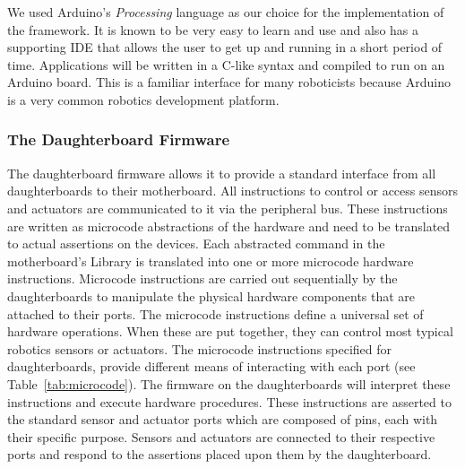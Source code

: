 	We used Arduino's \emph{Processing} language as our choice for the implementation of the framework. It is known to be very easy to learn and use and also has a supporting IDE that allows the user to get up and running in a short period of time. 
	Applications will be written in a C-like syntax and compiled to run on an Arduino board. This is a familiar interface for many roboticists because Arduino is a very common robotics development platform.
	
	\subsubsection{The Daughterboard Firmware} %
	\label{ssub:the_daughterboard_firmware}
	The daughterboard firmware allows it to provide a standard interface from all daughterboards to their motherboard. All instructions to control or access sensors and actuators are communicated to it via the peripheral bus. These instructions are written as microcode abstractions of the hardware and need to be translated to actual assertions on the devices. Each abstracted command in the motherboard's \xten Library is translated into one or more microcode hardware instructions. Microcode instructions are carried out sequentially by the daughterboards to manipulate the physical hardware components that are attached to their ports. The microcode instructions define a universal set of hardware operations. When these are put together, they can control most typical robotics sensors or actuators.
		The microcode instructions specified for daughterboards, provide different means of interacting with each port (see Table~\ref{tab:microcode}).
	The firmware on the daughterboards will interpret these instructions and execute hardware procedures. These instructions are asserted to the standard sensor and actuator ports which are composed of pins, each with their specific purpose. Sensors and actuators are connected to their respective ports and respond to the assertions placed upon them by the daughterboard.
	
